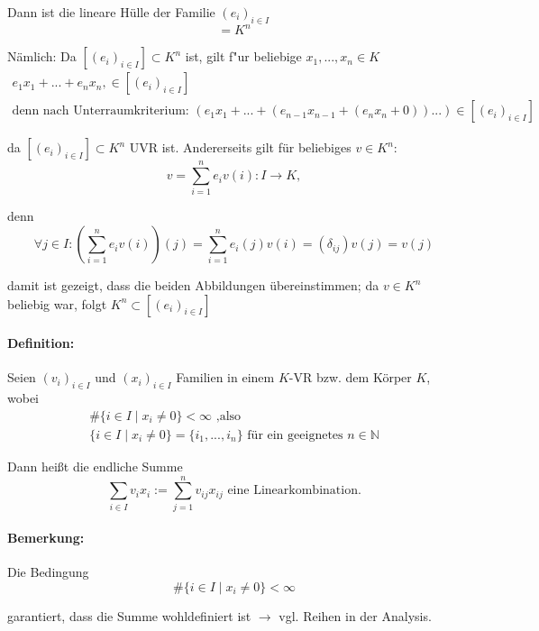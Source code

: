 	Dann ist die lineare Hülle der Familie $(e_i)_{i\in I}$
	\begin{equation*}
		[(e_i)_{i\in I}] = K^n
	\end{equation*}
	
	Nämlich: Da $[(e_i)_{i\in I}]\subset K^n$ ist, gilt f"ur beliebige $x_1,...,x_n\in K$
	\begin{gather*}
		e_1x_1+...+e_nx_n,\in [(e_i)_{i\in I}]\\ \text{denn nach Unterraumkriterium: } (e_1x_1+...+(e_{n-1}x_{n-1}+(e_nx_n + 0))...) \in [(e_i)_{i\in I}]
	\end{gather*}
	
	da $[(e_i)_{i\in I}] \subset K^n$ UVR ist. Andererseits gilt für beliebiges $v\in K^n$:
	\begin{equation*}
		v=\sum^n_{i=1}e_iv(i): I\to K,
	\end{equation*}
	
	denn
	\begin{equation*}
		\forall j\in I: \left(\sum^n_{i=1} e_iv(i)\right)(j) = \sum^n_{i=1}e_i(j)v(i) = (\delta_{ij}) v(j) = v(j)
	\end{equation*}
	
	damit ist gezeigt, dass die beiden Abbildungen übereinstimmen; da $v\in K^n$ beliebig war, folgt $K^n \subset [(e_i)_{i\in I}]$
	
\paragraph{Definition:}
	Seien $(v_i)_{i\in I}$ und $(x_i)_{i\in I}$ Familien in einem $ K $-VR bzw. dem Körper $ K $, wobei
	\begin{gather*}
		\# \{i\in I\mid x_i \neq 0\} < \infty\text{ ,also}\\
		\{ i\in I \mid x_i \neq 0\} = \{i_1,...,i_n\}\text{ für ein geeignetes } n\in \mathbb{N}
	\end{gather*}
	
	
	Dann heißt die endliche Summe
	\begin{equation*}
    	\sum_{i\in I} v_ix_i:= \sum^n_{j=1}v_{ij}x_{ij}\text{ eine Linearkombination.}
	\end{equation*}

\paragraph{Bemerkung:}
	Die Bedingung
	\begin{equation*}
		\#\{i\in I \mid x_i\neq 0\} <\infty
	\end{equation*}
	
	garantiert, dass die Summe wohldefiniert ist $\rightarrow$ vgl. Reihen in der Analysis.
